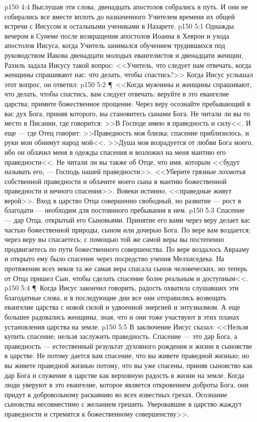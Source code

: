 \vs p150 4:4 Выслушав эти слова, двенадцать апостолов собрались в путь. И они не собирались все вместе вплоть до назначенного Учителем времени их общей встречи с Иисусом и остальными учениками в Назарете.
\vs p150 5:1 Однажды вечером в Сунеме после возвращения апостолов Иоанна в Хеврон и ухода апостолов Иисуса, когда Учитель занимался обучением трудившихся под руководством Иакова двенадцати молодых евангелистов и двенадцати женщин, Рахиль задала Иисусу такой вопрос: <<Учитель, что следует нам отвечать, когда женщины спрашивают нас: что делать, чтобы спастись?>> Когда Иисус услышал этот вопрос, он ответил:
\vs p150 5:2 \P\ <<Когда мужчины и женщины спрашивают, что делать, чтобы спастись, вам следует отвечать: веруйте в это евангелие царства; примите божественное прощение. Через веру осознайте пребывающий в вас дух Бога, приняв которого, вы становитесь сынами Бога. Не читали ли вы то место в Писании, где говорится: >>В Господе имею я праведность и силу<<. И еще --- где Отец говорит: >>Праведность моя близка; спасение приблизилось, и руки мои обнимут народ мой<<. >>Душа моя возрадуется от любви Бога моего, ибо он облачил меня в одежды спасения и возложил на меня мантию его праведности<<. Не читали ли вы также об Отце, что имя, которым <<будут называть его, --- Господь нашей праведности>>. <<Уберите грязные лохмотья собственной праведности и облачите моего сына в мантию божественной праведности и вечного спасения>>. Вовеки истинно, <<праведные живут верой>>. Вход в царство Отца совершенно свободный, но развитие --- рост в благодати --- необходим для постоянного пребывания в нем.
\vs p150 5:3 Спасение --- дар Отца, открытый его Сыновьями. Принятие его вами через веру делает вас частью божественной природы, сыном или дочерью Бога. По вере вам воздается; через веру вы спасаетесь; с помощью той же самой веры вы постепенно продвигаетесь по пути божественного совершенства. По вере воздалось Аврааму и открыто ему было спасение через посредство учения Мелхиседека. На протяжении всех веков та же самая вера спасала сынов человеческих, но теперь от Отца пришел Сын, чтобы сделать спасение более реальным и доступным<<.
\vs p150 5:4 \P\ Когда Иисус закончил говорить, радость охватила слушавших эти благодатные слова, и в последующие дни все они отправились возвещать евангелие царства с новой силой и удвоенной энергией и энтузиазмом. А еще большее радовались женщины, зная, что и они тоже участвуют в этих планах установления царства на земле.
\vs p150 5:5 В заключение Иисус сказал: <<Нельзя купить спасение; нельзя заслужить праведность. Спасение --- это дар Бога, а праведность --- естественный результат духовного рождения и жизни в сыновстве в царстве. Не потому дается вам спасение, что вы живете праведной жизнью; но вы живете праведной жизнью потому, что вы уже спасены, приняв сыновство как дар Бога и служение в царстве как верховную радость в жизни на земле. Когда люди уверуют в это евангелие, которое является откровением доброты Бога, они придут к добровольному раскаянию во всех известных грехах. Осознание сыновства несовместимо с желанием грешить. Уверовавшие в царство жаждут праведности и стремятся к божественному совершенству>>.
